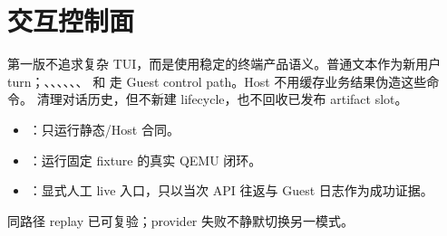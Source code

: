\section{交互控制面}

第一版不追求复杂 TUI，而是使用稳定的终端产品语义。普通文本作为新用户 turn；、、、、、、 和  走 Guest control path。Host 不用缓存业务结果伪造这些命令。 清理对话历史，但不新建 lifecycle，也不回收已发布 artifact slot。

\begin{itemize}
  \item {}：只运行静态/Host 合同。
  \item {}：运行固定 fixture 的真实 QEMU 闭环。
  \item {}：显式人工 live 入口，只以当次 API 往返与 Guest 日志作为成功证据。
\end{itemize}
同路径 replay 已可复验；provider 失败不静默切换另一模式。
